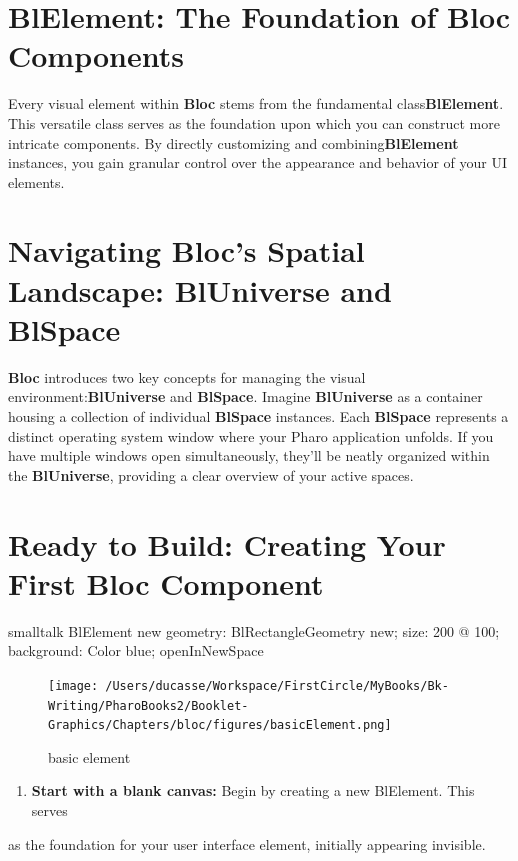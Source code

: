 \documentclass[10pt,twoside,english]{_support/latex/sbabook/sbabook}
\begin{document}
\section{BlElement: The Foundation of Bloc Components}
Every visual element within \textbf{Bloc} stems from the fundamental class\textbf{BlElement}. This versatile class serves as the foundation upon which you can
construct more intricate components. By directly customizing and combining\textbf{BlElement} instances, you gain granular control over the appearance and
behavior of your UI elements.

\section{Navigating Bloc's Spatial Landscape: BlUniverse and BlSpace}
\textbf{Bloc} introduces two key concepts for managing the visual environment:\textbf{BlUniverse} and \textbf{BlSpace}. Imagine \textbf{BlUniverse} as a container housing a
collection of individual \textbf{BlSpace} instances. Each \textbf{BlSpace} represents a
distinct operating system window where your Pharo application unfolds. If you
have multiple windows open simultaneously, they'll be neatly organized within
the \textbf{BlUniverse}, providing a clear overview of your active spaces.

\section{Ready to Build: Creating Your First Bloc Component}\begin{displaycode}{smalltalk}
BlElement new
geometry: BlRectangleGeometry  new;
size: 200 @ 100;
background: Color blue;
openInNewSpace
\end{displaycode}

\begin{figure}[htpb]
\begin{center}
\texttt{[image: /Users/ducasse/Workspace/FirstCircle/MyBooks/Bk-Writing/PharoBooks2/Booklet-Graphics/Chapters/bloc/figures/basicElement.png]}
\caption{basic element}
\end{center}
\end{figure}


\begin{enumerate}
    \item \textbf{Start with a blank canvas:} Begin by creating a new BlElement. This serves
\end{enumerate}

as the foundation for your user interface element, initially appearing
invisible.
\end{document}
